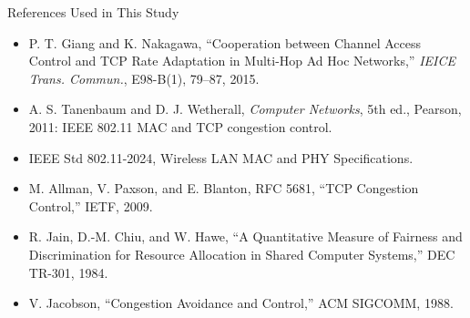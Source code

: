 \ConclusionStyle
\begin{frame}{References Used in This Study}
\fontsize{9}{10.8}\selectfont
\begin{itemize}
\item P. T. Giang and K. Nakagawa, ``Cooperation between Channel Access Control and TCP Rate Adaptation in Multi-Hop Ad Hoc Networks,'' \textit{IEICE Trans. Commun.}, E98-B(1), 79--87, 2015.
\item A. S. Tanenbaum and D. J. Wetherall, \textit{Computer Networks}, 5th ed., Pearson, 2011: IEEE 802.11 MAC and TCP congestion control.
\item IEEE Std 802.11-2024, Wireless LAN MAC and PHY Specifications.
\item M. Allman, V. Paxson, and E. Blanton, RFC 5681, ``TCP Congestion Control,'' IETF, 2009.
\item R. Jain, D.-M. Chiu, and W. Hawe, ``A Quantitative Measure of Fairness and Discrimination for Resource Allocation in Shared Computer Systems,'' DEC TR-301, 1984.
\item V. Jacobson, ``Congestion Avoidance and Control,'' ACM SIGCOMM, 1988.
\end{itemize}
\vspace{0.08cm}
\end{frame}
